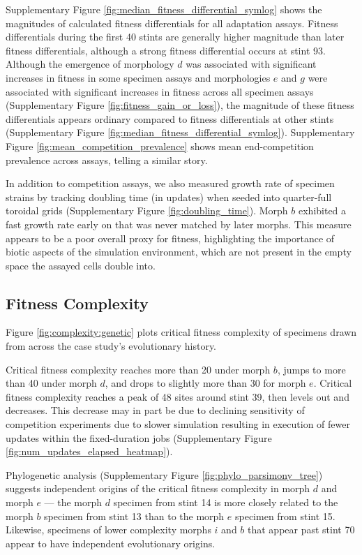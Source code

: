 Supplementary Figure \ref{fig:median_fitness_differential_symlog} shows the magnitudes of calculated fitness differentials for all adaptation assays.
Fitness differentials during the first 40 stints are generally higher magnitude than later fitness differentials, although a strong fitness differential occurs at stint 93.
Although the emergence of morphology $d$ was associated with significant increases in fitness in some specimen assays and morphologies $e$ and $g$ were associated with significant increases in fitness across all specimen assays (Supplementary Figure \ref{fig:fitness_gain_or_loss}), the magnitude of these fitness differentials appears ordinary compared to fitness differentials at other stints (Supplementary Figure \ref{fig:median_fitness_differential_symlog}).
Supplementary Figure \ref{fig:mean_competition_prevalence} shows mean end-competition prevalence across assays, telling a similar story.

In addition to competition assays, we also measured growth rate of specimen strains by tracking doubling time (in updates) when seeded into quarter-full toroidal grids (Supplementary Figure \ref{fig:doubling_time}).
Morph $b$ exhibited a fast growth rate early on that was never matched by later morphs.
This measure appears to be a poor overall proxy for fitness, highlighting the importance of biotic aspects of the simulation environment, which are not present in the empty space the assayed cells double into.


\subsection{Fitness Complexity}

Figure \ref{fig:complexity:genetic} plots critical fitness complexity of specimens drawn from across the case study's evolutionary history.

Critical fitness complexity reaches more than 20 under morph $b$, jumps to more than 40 under morph $d$, and drops to slightly more than 30 for morph $e$.
Critical fitness complexity reaches a peak of 48 sites around stint 39, then levels out and decreases.
This decrease may in part be due to declining sensitivity of competition experiments due to slower simulation resulting in execution of fewer updates within the fixed-duration jobs (Supplementary Figure \ref{fig:num_updates_elapsed_heatmap}).

Phylogenetic analysis (Supplementary Figure \ref{fig:phylo_parsimony_tree}) suggests independent origins of the critical fitness complexity in morph $d$ and morph $e$ --- the morph $d$ specimen from stint 14 is more closely related to the morph $b$ specimen from stint 13 than to the morph $e$ specimen from stint 15.
Likewise, specimens of lower complexity morphs $i$ and $b$ that appear past stint 70 appear to have independent evolutionary origins.


